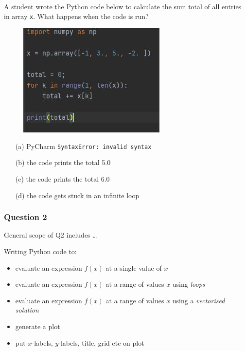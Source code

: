 \documentclass[english,14pt]{beamer}
\begin{document}

\begin{frame}[fragile]

\frametitle{}

{\small 
A student wrote the Python code below to calculate the sum total of all entries in array \texttt{x}. What happens when the code is run?}
\begin{figure}[ht]
	\centering
	\includegraphics[width=.5\textwidth]{figures/sampleq1}
\end{figure}

\begin{itemize}
	\item[(a)] PyCharm \texttt{SyntaxError:~invalid syntax}
	\item[(b)] the code prints the total 5.0
	\item[(c)] the code prints the total 6.0
	\item[(d)] the code gets stuck in an infinite loop
\end{itemize}

\end{frame}


\begin{frame}[fragile]

\frametitle{Question 2}

General scope of Q2 includes \ldots

\vspace*{5mm}

Writing Python code to:

\begin{itemize}
	\item evaluate an expression $f(x)$ at a single value of $x$
	\item evaluate an expression $f(x)$ at a range of values $x$ using \emph{loops}
	\item evaluate an expression $f(x)$ at a range of values $x$ using a \emph{vectorised solution}
	\item generate a plot
	\item put $x$-labels, $y$-labels, title, grid etc on plot
\end{itemize}

\end{frame}
\end{document}
